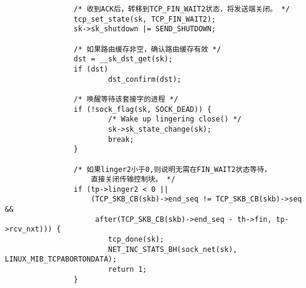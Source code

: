 \begin{verbatim}
		        /* 收到ACK后，转移到TCP_FIN_WAIT2状态，将发送端关闭。 */
		        tcp_set_state(sk, TCP_FIN_WAIT2);
		        sk->sk_shutdown |= SEND_SHUTDOWN;

		        /* 如果路由缓存非空，确认路由缓存有效 */
		        dst = __sk_dst_get(sk);
		        if (dst)
		                dst_confirm(dst);

		        /* 唤醒等待该套接字的进程 */
		        if (!sock_flag(sk, SOCK_DEAD)) {
		                /* Wake up lingering close() */
		                sk->sk_state_change(sk);
		                break;
		        }

		        /* 如果linger2小于0,则说明无需在FIN_WAIT2状态等待，
					直接关闭传输控制块。 */
		        if (tp->linger2 < 0 ||
		            (TCP_SKB_CB(skb)->end_seq != TCP_SKB_CB(skb)->seq &&
		             after(TCP_SKB_CB(skb)->end_seq - th->fin, tp->rcv_nxt))) {
		                tcp_done(sk);
		                NET_INC_STATS_BH(sock_net(sk), LINUX_MIB_TCPABORTONDATA);
		                return 1;
		        }
\end{verbatim}


